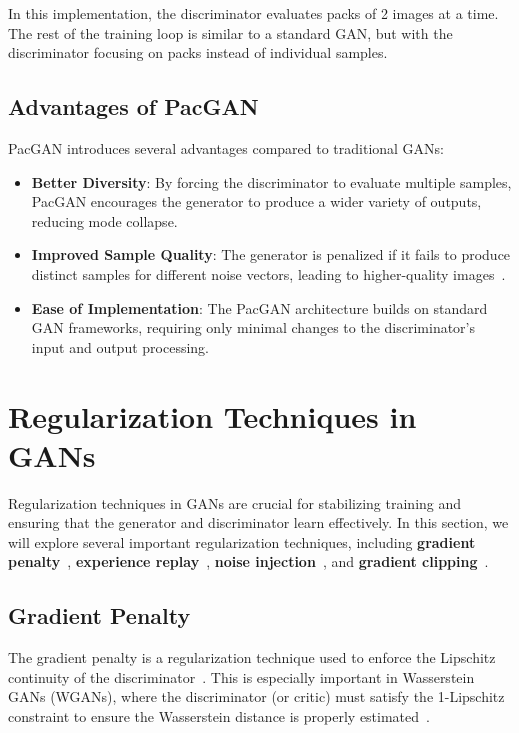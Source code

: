 In this implementation, the discriminator evaluates packs of 2 images at a time. The rest of the training loop is similar to a standard GAN, but with the discriminator focusing on packs instead of individual samples.

\subsection{Advantages of PacGAN}
PacGAN introduces several advantages compared to traditional GANs:

\begin{itemize}
    \item \textbf{Better Diversity}: By forcing the discriminator to evaluate multiple samples, PacGAN encourages the generator to produce a wider variety of outputs, reducing mode collapse.
    \item \textbf{Improved Sample Quality}: The generator is penalized if it fails to produce distinct samples for different noise vectors, leading to higher-quality images~\cite{lin2018pacgan}.
    \item \textbf{Ease of Implementation}: The PacGAN architecture builds on standard GAN frameworks, requiring only minimal changes to the discriminator's input and output processing.
\end{itemize}

\section{Regularization Techniques in GANs}
Regularization techniques in GANs are crucial for stabilizing training and ensuring that the generator and discriminator learn effectively. In this section, we will explore several important regularization techniques, including \textbf{gradient penalty}~\cite{gao2020data}, \textbf{experience replay}~\cite{wu2018memory}, \textbf{noise injection}~\cite{feng2021understanding}, and \textbf{gradient clipping}~\cite{zhang2019gradient}.

\subsection{Gradient Penalty}
The gradient penalty is a regularization technique used to enforce the Lipschitz continuity of the discriminator~\cite{gao2020data}. This is especially important in Wasserstein GANs (WGANs), where the discriminator (or critic) must satisfy the 1-Lipschitz constraint to ensure the Wasserstein distance is properly estimated~\cite{arjovsky2017wasserstein}.

